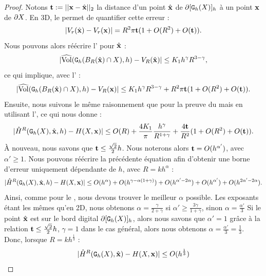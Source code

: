 %
\begin{proof}
%
Notons $\vt \EqDef ||\vx-\vxH||_2$ la distance d'un point $\vxH$ de
$\Bd{\Body{\DSh}{h}}$ à un point $\vx$ de $\dS$. En 3D, le
 permet de quantifier cette erreur :
%
\begin{equation}\label{eq:volume-shift-error}
  | V_r(\vxH) - V_r(\vx) | = R^2 \pi \vt (1 + O(R^2)+O(\vt)).
\end{equation}
%
Nous pouvons alors réécrire l'
pour $\vxH$ :
%
\begin{equation}
  | \VolC(\DigF{\Ball{R}{\vxH} \cap \Shape}{h}, h) - V_R(\vxH) | \le K_1 h^\gamma R^{3-\gamma},
\end{equation}
%
ce qui implique, avec l' :
%
\begin{equation}\label{eq:shift-B-R-error-bound-3D}
  | \VolC(\DigF{\Ball{R}{\vxH} \cap \Shape}{h}, h) - V_R(\vx) |  \le K_1 h^\gamma R^{3-\gamma} +  R^2 \pi \vt (1 + O(R^2) + O(\vt)).
\end{equation}
%
Ensuite, nous suivons le même raisonnement que pour la preuve du
 mais en utilisant
l', ce qui nous donne :
%
\begin{equation}\label{eq:shift-curvhat-error-bound-3D}
  | \MeanCurvH{R}(\DSh,\vxH,h) - \MeanCurv(\Shape,\vx) | \le O(R) + \frac{4 K_1}{\pi} \frac{h^\gamma}{R^{1+\gamma}} + \frac{4 \vt}{R^2}(1 + O(R^2) + O(\vt)).
\end{equation}
%
À nouveau, nous savons que $\vt \le \frac{\sqrt{2}}{2}h$. Nous noterons alors
$\vt = O(h^{\alpha'})$, avec $\alpha' \ge 1$. Nous pouvons réécrire la
précédente équation afin d'obtenir une borne d'erreur uniquement dépendante de
$h$, avec $R=kh^{\alpha}$ :
%
\begin{equation} \label{eq:shift-meancurvhat-error-bound-h-only}
  | \MeanCurvH{R}(\DSh,\vxH,h) - \MeanCurv(\Shape,\vx) |
  \le O(h^\alpha) + O(h^{\gamma-\alpha(1+\gamma)}) + O(h^{\alpha'-2\alpha})
    + O(h^{\alpha'}) + O(h^{2\alpha'-2\alpha}).
\end{equation}
%
Ainsi, comme pour le , nous devons trouver
le meilleur $\alpha$ possible. Les exposants étant les mêmes qu'en 2D, nous
obtenons $\alpha = \frac{\gamma}{2 + \gamma}$ si $\alpha' \ge \frac{3 \gamma}{1 +
\gamma}$, sinon $\alpha = \frac{\alpha'}{3}$
%
Si le point $\vxH$ est sur le bord digital $\Bd{\Body{\DSh}{h}}$, alors nous
savons que $\alpha'=1$ grâce à la relation $\vt \le \frac{\sqrt{2}}{2}h$, $\gamma =
1$ dans le cas général, alors nous obtenons $\alpha = \frac{\alpha'}{3} =
\frac{1}{3}$. Donc, lorsque $R = kh^{\frac{1}{3}}$ :
%
\begin{equation}
  | \MeanCurvH{R}(\DSh,\vxH) - \MeanCurv(\Shape,\vx) | \le O(h^{\frac{1}{3}})
\end{equation}
%
\end{proof}
%
